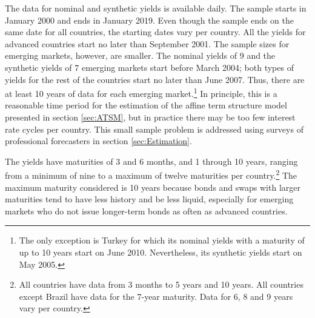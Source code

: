 {The data for nominal and synthetic yields is available daily. 
The sample starts in January 2000 and ends in January 2019.
Even though the sample ends on the same date for all countries, the starting dates 
vary per country.
All the yields for advanced countries start no later than September 2001.
The sample sizes for emerging markets, however, are smaller.
The nominal yields of 9 and the synthetic yields of 7 emerging markets start before March 2004; both types of yields for the rest of the countries start no later than June 2007.
Thus, there are at least 10 years of data for each emerging market.\footnote{ The only exception is Turkey for which its nominal yields with a maturity of up to 10 years start on June 2010. Nevertheless, its synthetic yields start on May 2005.}
In principle, this is a reasonable time period for the estimation of the affine term structure model presented in section \ref{sec:ATSM}, but in practice there may be too few interest rate cycles per country.
This small sample problem is addressed using surveys of professional forecasters in section \ref{sec:Estimation}. 

The yields have maturities of 3 and 6 months, and 1 through 10 years, ranging from a minimum of nine to a maximum of twelve maturities per country.\footnote{ All countries have data from 3 months to 5 years and 10 years. All countries except Brazil have data for the 7-year maturity. Data for 6, 8 and 9 years vary per country.} 
The maximum maturity considered is 10 years because bonds and swaps with larger maturities tend to have less history and be less liquid, especially for emerging markets who do not issue longer-term bonds as often as advanced countries.
%	

}
